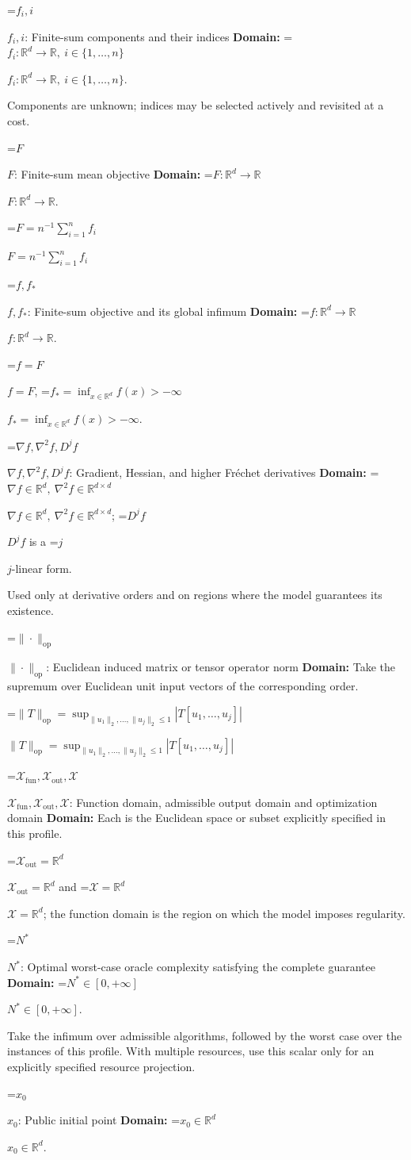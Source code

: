 \documentclass[10pt,a4paper]{article}
\newcommand{\AtlasMath}[1]{\par\begingroup\centering\setbox0=\hbox{$\displaystyle #1$}\ifdim\wd0>1.4\linewidth\typeout{ATLAS WIDE FORMULA: \the\wd0}\fi\ifdim\wd0>\linewidth\resizebox{\linewidth}{!}{\box0}\else\box0\fi\par\endgroup}
\newcommand{\AtlasInlineMath}[1]{\begingroup\setbox0=\hbox{$#1$}\ifdim\wd0>.4\linewidth\endgroup\AtlasMath{#1}\else\endgroup$#1$\fi}
\begin{document}
\AtlasInlineMath{f_i,i}: Finite-sum components and their indices \textbf{Domain:} \AtlasInlineMath{f_i:\mathbb{R}^d\to\mathbb{R},\ i\in\{1,\ldots,n\}}.

Components are unknown; indices may be selected actively and revisited at a cost.

\AtlasInlineMath{F}: Finite-sum mean objective \textbf{Domain:} \AtlasInlineMath{F:\mathbb{R}^d\to\mathbb{R}}.

\AtlasInlineMath{F=n^{-1}\sum_{i=1}^n f_i}

\AtlasInlineMath{f,f_*}: Finite-sum objective and its global infimum \textbf{Domain:} \AtlasInlineMath{f:\mathbb{R}^d\to\mathbb{R}}.

\AtlasInlineMath{f=F}, \AtlasInlineMath{f_*=\inf_{x\in\mathbb{R}^d}f(x)>-\infty}.

\AtlasInlineMath{\nabla f,\nabla^2f,D^jf}: Gradient, Hessian, and higher Fréchet derivatives \textbf{Domain:} \AtlasInlineMath{\nabla f\in\mathbb{R}^d,\ \nabla^2f\in\mathbb{R}^{d\times d}}; \AtlasInlineMath{D^jf} is a \AtlasInlineMath{j}-linear form.

Used only at derivative orders and on regions where the model guarantees its existence.

\AtlasInlineMath{\|\cdot\|_{\mathrm{op}}}: Euclidean induced matrix or tensor operator norm \textbf{Domain:} Take the supremum over Euclidean unit input vectors of the corresponding order.

\AtlasInlineMath{\|T\|_{\mathrm{op}}=\sup_{\|u_1\|_2,\ldots,\|u_j\|_2\le1}|T[u_1,\ldots,u_j]|}

\AtlasInlineMath{\mathcal{X}_{\mathrm{fun}},\mathcal{X}_{\mathrm{out}},\mathcal{X}}: Function domain, admissible output domain and optimization domain \textbf{Domain:} Each is the Euclidean space or subset explicitly specified in this profile.

\AtlasInlineMath{\mathcal{X}_{\mathrm{out}}=\mathbb{R}^d} and \AtlasInlineMath{\mathcal{X}=\mathbb{R}^d}; the function domain is the region on which the model imposes regularity.

\AtlasInlineMath{N^*}: Optimal worst-case oracle complexity satisfying the complete guarantee \textbf{Domain:} \AtlasInlineMath{N^*\in[0,+\infty]}.

Take the infimum over admissible algorithms, followed by the worst case over the instances of this profile. With multiple resources, use this scalar only for an explicitly specified resource projection.

\AtlasInlineMath{x_0}: Public initial point \textbf{Domain:} \AtlasInlineMath{x_0\in\mathbb{R}^d}.
\end{document}
